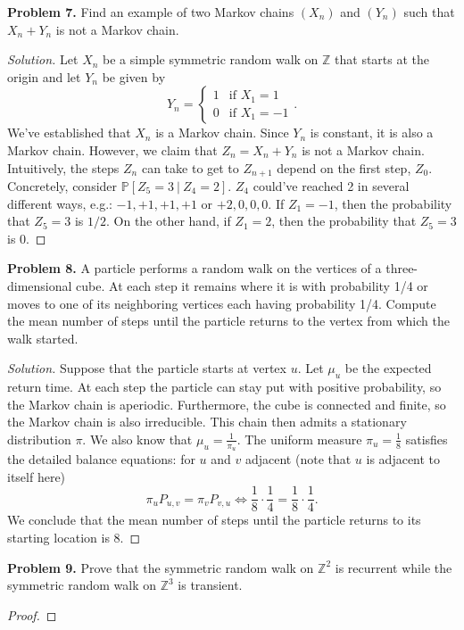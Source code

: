 \documentclass[11pt,letterpaper]{report}
\newcommand{\integers}{\mathbb{Z}}
\newcommand{\Prob}{\mathbb{P}}
\newenvironment{solution}
{\begin{proof}[Solution]}
{\end{proof}}
\begin{document}
\noindent\textbf{Problem 7. }
Find an example of two Markov chains $(X_n)$ and $(Y_n)$ such that $X_n+Y_n$ is not a Markov chain.
\begin{solution}
	Let $X_n$ be a simple symmetric random walk on $\integers$ that starts at the origin and let $Y_n$ be given by
	\[
	Y_n = \begin{cases}
		1&\text{if }X_1 = 1\\
		0&\text{if }X_1 = -1
	\end{cases}.
	\]
	We've established that $X_n$ is a Markov chain. Since $Y_n$ is constant, it is also a Markov chain. However, we claim that $Z_n = X_n+Y_n$ is not a Markov chain. Intuitively, the steps $Z_n$ can take to get to $Z_{n+1}$ depend on the first step, $Z_0$. Concretely, consider $\Prob[Z_5 = 3\ |\ Z_4 = 2]$. $Z_4$ could've reached 2 in several different ways, e.g.: $-1, +1, +1, +1$ or $+2,0, 0, 0$. If $Z_1 = -1$, then the probability that $Z_5=3$ is $1/2$. On the other hand, if $Z_1 = 2$, then the probability that $Z_5 = 3$ is $0$.
\end{solution}

\noindent\textbf{Problem 8. }
A particle performs a random walk on the vertices of a three-dimensional cube. At each step it remains where it is with probability 1/4 or moves to one of its neighboring vertices each having probability 1/4. Compute the mean number of steps until the particle returns to the vertex from which the walk started.
\begin{solution}
	Suppose that the particle starts at vertex $u$. Let $\mu_u$ be the expected return time. At each step the particle can stay put with positive probability, so the Markov chain is aperiodic. Furthermore, the cube is connected and finite, so the Markov chain is also irreducible. This chain then admits a stationary distribution $\pi$. We also know that $\mu_u = \frac{1}{\pi_u}$. The uniform measure $\pi_u = \frac{1}{8}$ satisfies the detailed balance equations: for $u$ and $v$ adjacent (note that $u$ is adjacent to itself here)
	\[
		\pi_uP_{u,v} = \pi_vP_{v,u} \iff \frac{1}{8}\cdot \frac{1}{4} = \frac{1}{8}\cdot \frac{1}{4}.
	\]
	We conclude that the mean number of steps until the particle returns to its starting location is 8.
\end{solution}

\noindent\textbf{Problem 9. }
Prove that the symmetric random walk on $\integers^2$ is recurrent while the symmetric random walk on $\integers^3$ is transient.
\begin{proof}
	
\end{proof}
\end{document}
